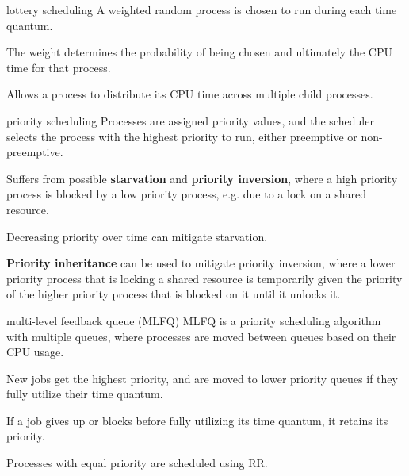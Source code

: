\begin{defn}{lottery scheduling}
    A weighted random process is chosen to run during each time quantum.
    
    The weight determines the probability of being chosen and ultimately the CPU time for that process.

    Allows a process to distribute its CPU time across multiple child processes.
\end{defn}

\begin{defn}{priority scheduling}
    Processes are assigned priority values, and the scheduler selects the process with the highest priority to run, either preemptive or non-preemptive.

    Suffers from possible \textbf{starvation} and \textbf{priority inversion}, where a high priority process is blocked by a low priority process, e.g. due to a lock on a shared resource.
    
    Decreasing priority over time can mitigate starvation.

    \textbf{Priority inheritance} can be used to mitigate priority inversion, where a lower priority process that is locking a shared resource is temporarily given the priority of the higher priority process that is blocked on it until it unlocks it.
\end{defn}

\begin{defn}{multi-level feedback queue (MLFQ)}
    MLFQ is a priority scheduling algorithm with multiple queues, where processes are moved between queues based on their CPU usage.

    New jobs get the highest priority, and are moved to lower priority queues if they fully utilize their time quantum.

    If a job gives up or blocks before fully utilizing its time quantum, it retains its priority.

    Processes with equal priority are scheduled using RR.
\end{defn}